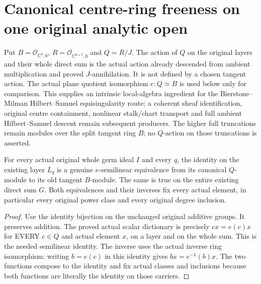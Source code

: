\section{Canonical centre-ring freeness on one original analytic open}

Put $B=\mathcal O_{\mathbb C^d,0}$, $R=\mathcal O_{\mathbb C^{d+t},0}$ and
$Q=R/J$.  The action of $Q$ on the original layers and their whole direct
sum is the actual action already descended from ambient multiplication and
proved $J$-annihilation.  It is not defined by a chosen tangent action.
The actual plane quotient isomorphism $e:Q\simeq B$ is used below only for
comparison.  This supplies an intrinsic local-algebra ingredient for the
Bierstone--Milman Hilbert--Samuel equisingularity route; a coherent sheaf
identification, original centre containment, nonlinear stalk/chart transport
and full ambient Hilbert--Samuel descent remain subsequent producers.
The higher full truncations remain modules over the split tangent ring $B$;
no $Q$-action on those truncations is asserted.

\begin{lemma}
\label{hir:relative-normal-canonical-centre-trace-semilinear}
\leanok
For every actual original whole germ ideal $I$ and every $q$, the identity
on the existing layer $L_q$ is a genuine $e$-semilinear equivalence from
its canonical $Q$-module to its old tangent $B$-module.  The same is true
on the entire existing direct sum $G$.  Both equivalences and their
inverses fix every actual element, in particular every original power
class and every original degree inclusion.
\end{lemma}
\begin{proof}
Use the identity bijection on the unchanged original additive groups.
It preserves addition.  The proved actual scalar dictionary is precisely
$c x=e(c)x$ for EVERY $c\in Q$ and actual element $x$, on a layer and on
the whole sum.  This is the needed semilinear identity.  The inverse uses
the actual inverse ring isomorphism: writing $b=e(c)$ in this identity
gives $b x=e^{-1}(b)x$.  The two functions compose to the identity and
fix actual classes and inclusions because both functions are literally
the identity on those carriers.
\end{proof}

